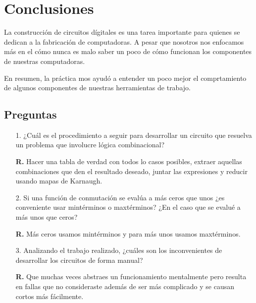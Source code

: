 \documentclass[12pt, letterpaper]{article}
\begin{document}
        \section{Conclusiones}
            
            \hspace{.5cm}
            La construcción de circuitos dígitales es una tarea importante para quienes se dedican
            a la fabricación de computadoras. A pesar que nosotros nos enfocamos más en el cómo nunca 
            es malo saber un poco de cómo funcionan los componentes de nuestras computadoras.

            En resumen, la práctica mos ayudó a entender un poco mejor el comprtamiento de algunos 
            componentes de nuestras herramientas de trabajo.

            \subsection{Preguntas}

            \begin{itemize}
              \item[1.] ¿Cuál es el procedimiento a seguir para desarrollar 
                        un circuito que resuelva un problema que involucre 
                        lógica combinacional?\vspace{.1cm}

                        \textbf{R.} Hacer una tabla de verdad con todos lo 
                        casos posibles, extraer aquellas combinaciones que 
                        den el resultado deseado, juntar las expresiones y 
                        reducir usando mapas de Karnaugh.\vspace{.1cm} 

              \item[2.] Si una función de conmutación se evalúa a más ceros 
                        que unos ¿es conveniente usar mintérminos o maxtérminos? 
                        ¿En el caso que se evalué a más unos que ceros?\vspace{.1cm}

                        \textbf{R.} Más ceros usamos mintérminos y para más unos 
                        usamos maxtérminos.\vspace{.1cm}

              \item[3.] Analizando el trabajo realizado, ¿cuáles son los inconvenientes 
                        de desarrollar los circuitos de forma manual?\vspace{.1cm}

                        \textbf{R.} Que muchas veces abstraes un funcionamiento mentalmente 
                        pero resulta en fallas que no consideraste además de ser más complicado 
                        y se causan cortos más fácilmente.\vspace{.1cm} 
            \end{itemize}



        
\end{document}
